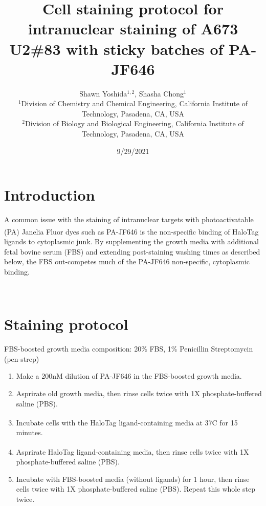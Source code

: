 \documentclass[%
 reprint,
 amsmath,amssymb,
 aps,
nobalancelastpage
]{revtex4-1}
\begin{document}
\title{Cell staining protocol for intranuclear staining of A673 U2\#83 with sticky batches of PA-JF646}
\author{Shawn Yoshida$^{1,2}$, Shasha Chong$^{1}$ \\
        \small $^{1}$Division of Chemistry and Chemical Engineering, California Institute of Technology, Pasadena, CA, USA \\
        \small $^{2}$Division of Biology and Biological Engineering, California Institute of Technology, Pasadena, CA, USA
}

\date{9/29/2021}

\maketitle



\section{\label{sec:level1}Introduction}

A common issue with the staining of intranuclear targets with photoactivatable (PA) Janelia Fluor\textsuperscript{\textregistered} dyes such as PA-JF646 is the non-specific binding of HaloTag\textsuperscript{\textregistered} ligands to cytoplasmic junk. By supplementing the growth media with additional fetal bovine serum (FBS) and extending post-staining washing times as described below, the FBS out-competes much of the PA-JF646 non-specific, cytoplasmic binding.

\,

\section{\label{sec:level2}Staining protocol}

FBS-boosted growth media composition: 
20\% FBS, 1\% Penicillin Streptomycin (pen-strep) 
\begin{enumerate}
  \item Make a 200nM dilution of PA-JF646 in the FBS-boosted growth media. 
  \item Asprirate old growth media, then rinse cells twice with 1X phosphate-buffered saline (PBS).
  \item Incubate cells with the HaloTag\textsuperscript{\textregistered} ligand-containing media at 37\degree C for 15 minutes. 
  \item Asprirate HaloTag\textsuperscript{\textregistered} ligand-containing media, then rinse cells twice with 1X phosphate-buffered saline (PBS). 
  \item Incubate with FBS-boosted media (without ligands) for 1 hour, then rinse cells twice with 1X phosphate-buffered saline (PBS). Repeat this whole step twice. 
\end{enumerate}
\end{document}

